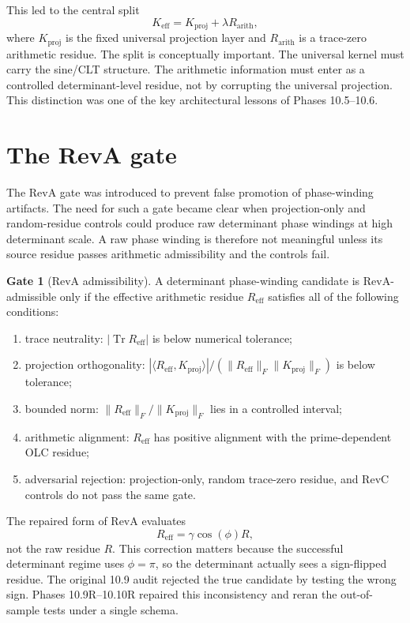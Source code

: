 \documentclass[11pt]{article}
\newcommand{\Rarith}{R_{\mathrm{arith}}}
\newcommand{\Kproj}{K_{\mathrm{proj}}}
\newcommand{\Keff}{K_{\mathrm{eff}}}
\newcommand{\Tr}{\operatorname{Tr}}
\theoremstyle{definition}
\newtheorem{gate}{Gate}
\theoremstyle{plain}
\begin{document}
This led to the central split
\begin{equation}
  \Keff = \Kproj + \lambda\Rarith,
\end{equation}
where $\Kproj$ is the fixed universal projection layer and $\Rarith$ is a trace-zero arithmetic residue.  The split is conceptually important.  The universal kernel must carry the sine/CLT structure.  The arithmetic information must enter as a controlled determinant-level residue, not by corrupting the universal projection.  This distinction was one of the key architectural lessons of Phases 10.5--10.6.

\section{The RevA gate}

The RevA gate was introduced to prevent false promotion of phase-winding artifacts.  The need for such a gate became clear when projection-only and random-residue controls could produce raw determinant phase windings at high determinant scale.  A raw phase winding is therefore not meaningful unless its source residue passes arithmetic admissibility and the controls fail.

\begin{gate}[RevA admissibility]
A determinant phase-winding candidate is RevA-admissible only if the effective arithmetic residue $R_{\mathrm{eff}}$ satisfies all of the following conditions:
\begin{enumerate}[label=(\roman*)]
  \item trace neutrality: $|\Tr R_{\mathrm{eff}}|$ is below numerical tolerance;
  \item projection orthogonality: $|\langle R_{\mathrm{eff}},\Kproj\rangle|/(\|R_{\mathrm{eff}}\|_F\|\Kproj\|_F)$ is below tolerance;
  \item bounded norm: $\|R_{\mathrm{eff}}\|_F/\|\Kproj\|_F$ lies in a controlled interval;
  \item arithmetic alignment: $R_{\mathrm{eff}}$ has positive alignment with the prime-dependent OLC residue;
  \item adversarial rejection: projection-only, random trace-zero residue, and RevC controls do not pass the same gate.
\end{enumerate}
\end{gate}

The repaired form of RevA evaluates
\begin{equation}
  R_{\mathrm{eff}}=\gamma\cos(\phi)R,
\end{equation}
not the raw residue $R$.  This correction matters because the successful determinant regime uses $\phi=\pi$, so the determinant actually sees a sign-flipped residue.  The original 10.9 audit rejected the true candidate by testing the wrong sign.  Phases 10.9R--10.10R repaired this inconsistency and reran the out-of-sample tests under a single schema.
\end{document}
